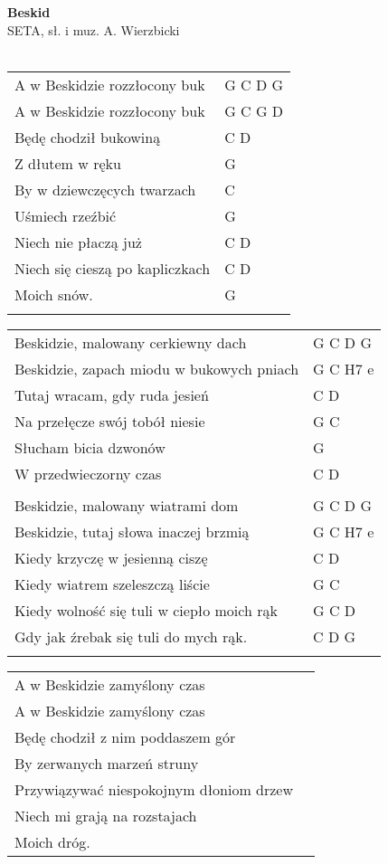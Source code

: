\documentclass[a5paper]{article}
\begin{document}


\noindent
\fontsize{12pt}{15pt}\selectfont
\textbf{Beskid} \\
\fontsize{8pt}{10pt}\selectfont
SETA, sł. i muz. A. Wierzbicki \\ \\
\fontsize{10pt}{12pt}\selectfont
{}
\begin{tabular}{@{}p{8.5cm}p{3cm}@{}}
\noindent
A w Beskidzie rozzłocony buk & G C D G \\
A w Beskidzie rozzłocony buk & G C G D \\
Będę chodził bukowiną & C D \\
Z dłutem w ręku & G \\
By w dziewczęcych twarzach & C \\
Uśmiech rzeźbić & G \\
Niech nie płaczą już & C D \\
Niech się cieszą po kapliczkach & C D \\
Moich snów. & G \\ \\
\end{tabular}

\noindent
\begin{tabular}{@{}p{7.5cm}p{3cm}@{}}
Beskidzie, malowany cerkiewny dach & G C D G \\
Beskidzie, zapach miodu w bukowych pniach & G C H7 e \\
Tutaj wracam, gdy ruda jesień & C D \\
Na przełęcze swój tobół niesie & G C \\
Słucham bicia dzwonów & G \\
W przedwieczorny czas & C D \\ \\
Beskidzie, malowany wiatrami dom & G C D G \\
Beskidzie, tutaj słowa inaczej brzmią & G C H7 e \\
Kiedy krzyczę w jesienną ciszę & C D \\
Kiedy wiatrem szeleszczą liście & G C \\
Kiedy wolność się tuli w ciepło moich rąk & G C D \\
Gdy jak źrebak się tuli do mych rąk. & C D G \\ \\
\end{tabular}

\noindent
\begin{tabular}{@{}p{8.5cm}p{3cm}@{}}
A w Beskidzie zamyślony czas\\
A w Beskidzie zamyślony czas\\
Będę chodził z nim poddaszem gór\\
By zerwanych marzeń struny\\
Przywiązywać niespokojnym dłoniom drzew\\
Niech mi grają na rozstajach\\
Moich dróg.
\end{tabular}
\end{document}
